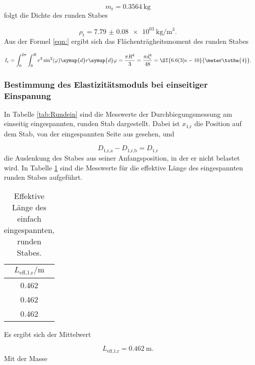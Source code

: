 \begin{equation}
  m_\text{r} = \SI{0.3564}{\kilo\gram}
\end{equation}
folgt die Dichte des runden Stabes

\begin{equation}
  \rho_\text{r} = \SI{7.79(8)e03}{\kilo\gram\per\cubic\meter}.
\end{equation}
Aus der Formel \eqref{eqn:} ergibt sich das Flächenträgheitsmoment des runden
Stabes

\begin{equation}
  I_\text{r} = \int_{0}^{2\pi}\int_{0}^{R} r^3 \sin^2(\varphi) \symup{d}r
  \symup{d}\varphi = \frac{\pi R^4}{3} = \frac{\pi d_\text{r}^4}{48} =
  \SI{6.6(3)e-10}{\meter\tothe{4}}.
\end{equation}

\subsubsection{Bestimmung des Elastizitätsmoduls bei einseitiger Einspanung}

In Tabelle \ref{tab:Rundein} sind die Messwerte der Durchbiegungsmessung am
einseitig eingespannten, runden Stab dargestellt.
Dabei ist $x_\text{1,r}$ die Position auf dem Stab, von der eingespannten Seite
aus gesehen, und

\begin{equation}
  D_\text{1,r,a} - D_\text{1,r,b} = D_\text{1,r}
\end{equation}
die Auslenkung des Stabes aus seiner Anfangsposition, in der er nicht belastet
wird. In Tabelle \ref{tab:Rundeinleff} sind die Messwerte für die effektive
Länge des eingespannten runden Stabes aufgeführt.

\begin{table}[H]
  \centering
  \caption{Effektive Länge des einfach eingespannten, runden Stabes.}
  \label{tab:Rundeinleff}
  \begin{tabular}{c}
    \toprule
    $L_\text{eff,1,r}/\si{\meter}$ \\
    \midrule
    0.462 \\
    0.462 \\
    0.462 \\
    \bottomrule
  \end{tabular}
\end{table}

Es ergibt sich der Mittelwert

\begin{equation}
  L_\text{eff,1,r} = \SI{0.462}{\meter}.
\end{equation}
Mit der Masse

